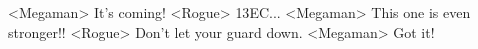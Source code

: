 <Megaman> It's coming! 
<Rogue> {13}{EC}... 
<Megaman> This one is even stronger!! 
<Rogue> Don't let your guard down. 
<Megaman> Got it! 
